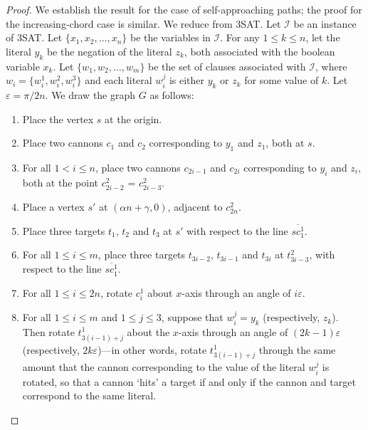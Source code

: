 \documentclass[11pt]{article}
\begin{document}
\begin{proof}
We establish the result for the case of self-approaching paths; the proof for the increasing-chord case is similar.  We reduce from 3SAT.  Let $\mathcal{I}$ be an instance of 3SAT. Let $\{x_1,x_2,\ldots,x_n\}$ be the variables in $\mathcal{I}$. For any $1\leq k \leq n$, let the literal $y_k$ be the negation of the literal $z_k$, both associated with the boolean variable $x_k$. Let $\{w_1,w_2,\ldots,w_m\}$ be the set of clauses associated with $\mathcal{I}$, where $w_i=\{w_i^1,w_i^2,w_i^3\}$ and each literal $w_i^j$ is either $y_k$ or $z_k$ for some value of $k$.  Let $\varepsilon = \pi/2n$. We draw the graph $G$ as follows:
\begin{enumerate}
\item Place the vertex $s$ at the origin.
\item Place two cannons $c_1$ and $c_2$ corresponding to $y_1$ and $z_1$, both at $s$.
\item For all $1 < i \leq n$, place two cannons $c_{2i-1}$ and $c_{2i}$ corresponding to $y_i$ and $z_i$, both at the point $c_{2i-2}^2$ = $c_{2i-3}^2$.
\item Place a vertex $s'$ at $(\alpha n+\gamma,0)$, adjacent to $c_{2n}^2$.
\item Place three targets $t_1$, $t_2$ and $t_3$ at $s'$ with respect to the line $\overline{sc_1^1}$.
\item For all $1 \leq i \leq m$, place three targets $t_{3i-2}$, $t_{3i-1}$ and $t_{3i}$ at $t_{3i-3}^2$, with respect to the line $\overline{sc_1^1}$.
\item For all $1 \leq i \leq 2n$, rotate $c_i^1$ about $x$-axis through an angle of $i\varepsilon$.
\item For all $1 \leq i \leq m$ and $1\leq j \leq 3$, suppose that $w_i^j = y_k$ (respectively, $z_k$).  Then rotate $t_{3(i-1)+j}^1$ about the $x$-axis through an angle of $(2k-1)\varepsilon$ (respectively, $2k\varepsilon$)---in other words, rotate $t_{3(i-1)+j}^1$ through the same amount that the cannon corresponding to the value of the literal $w_i^j$ is rotated, so that a cannon `hits' a target if and only if the cannon and target correspond to the same literal.
\end{enumerate}

\end{proof}
\end{document}
